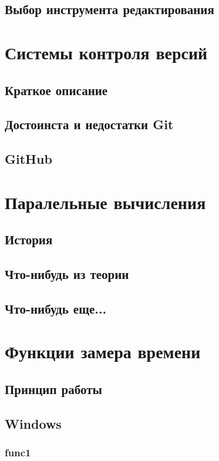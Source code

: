 \documentclass{article}
\begin{document}
		\subsection{Выбор инструмента редактирования}
	\newpage
	\section{Системы контроля версий}
		\subsection{Краткое описание}
		\subsection{Достоинста и недостатки Git}
		\subsection{GitHub}
	\newpage
	\section{Паралельные вычисления}
		\subsection{История}
		\subsection{Что-нибудь из теории}
		\subsection{Что-нибудь еще...}
	\newpage
	\section{Функции замера времени}
		\subsection{Принцип работы}
		\subsection{Windows}
			\subsubsection{func1}
\end{document}
